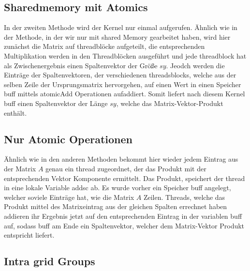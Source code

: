 \documentclass[10pt,a4paper]{article}
\begin{document}
	 \subsection{Sharedmemory mit Atomics}
	 In der zweiten Methode wird der Kernel nur einmal aufgerufen. Ähnlich wie in der Methode, in der wir nur mit shared Memory gearbeitet haben, wird hier zunächst die Matrix auf threadblöcke aufgeteilt, die entsprechenden Multiplikation werden in den Threadblöcken ausgeführt und jede threadblock hat als Zwischenergebnis einen Spaltenvektor der Größe $sy$. Jeodch werden die Einträge der Spaltenvektoren, der verschiedenen threadsblocks, welche aus der selben Zeile der Ursprungsmatrix hervorgehen, auf einen Wert in einen Speicher buff mittels atomicAdd Operationen aufaddiert. Somit liefert nach diesem Kernel buff einen Spaltenvektor der Länge $sy$, welche das Matrix-Vektor-Produkt enthält.
	 \subsection{Nur Atomic Operationen}
	 Ähnlich wie in den anderen Methoden bekommt hier wieder jedem Eintrag aus der Matrix $A$ genau ein thread zugeordnet, der das Produkt mit der entsprechenden Vektor Komponente ermittelt. Das Produkt, speichert der thread in eine lokale Variable addsc ab. Es wurde vorher ein Speicher buff angelegt, welcher soviele Einträge hat, wie die Matrix $A$ Zeilen. Threads, welche das Produkt mittel des Matrixeintrag aus der gleichen Spalten errechnet haben addieren ihr Ergebnis jetzt auf den entsprechenden Eintrag in der variablen buff auf, sodass buff am Ende ein Spaltenvektor, welcher dem Matrix-Vektor Produkt entspricht liefert.
	 \subsection{Intra grid Groups}  
\end{document}
